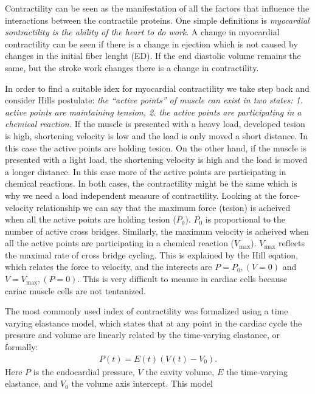Contractility can be seen as the manifestation of all the factors that
influence the interactions between the contractile proteins.
One simple definitions is \emph{myocardial sontractility is the
  ability of the heart to do work}. A change in myocardial
contractility can be seen if there is a change in ejection which is
not caused by changes in the initial fiber lenght (ED). If the end
diastolic volume remains the same, but the stroke work changes there
is a change in contractility.



In order to find a suitable idex for myocardial contractility we take
step back and consider Hills postulate: \emph{the ``active points'' of
  muscle can exist in two states: 1. active points are maintaining
  tension, 2. the active points are participating in a chemical
  reaction.} 
If the muscle is presented with a heavy load, developed tesion is
high, shortening velocity is low and the load is only moved a short
distance. In this case the active points are holding tesion.
On the other hand, if the muscle is presented with a light load, the
shortening velocity is high and the load is moved a longer
distance. In this case more of the active points are participating in
chemical reactions. 
In both cases, the contractility might be the same which is why we
need a load independent measure of contractility.
Looking at the force-velocity relationship we can say that the maximum
force (tesion) is acheived when all the active points are holding
tesion ($P_0$). $P_0$ is proportional to the number of active
cross bridges.
Similarly, the maximum velocity is acheived when all
the active points are participating in a chemical reaction
($V_{\text{max}}$). $V_{\text{max}}$ reflects the maximal rate of
cross bridge cycling. 
This is explained by the Hill eqation, which
relates the force to velocity, and the interects are $P = P_0, (V = 0)$
and $V = V_{\text{max}}, (P = 0)$. This is very difficult to meause in
cardiac cells because cariac muscle cells are not tentanized.

The most commonly used index of contractility was formalized
\cite{sagawa1977end} using a time varying elastance model, which
states that at any point in the cardiac cycle the pressure and volume
are linearly related by the time-varying elastance, or formally:
\begin{align}
  P(t) = E(t)( V(t) - V_0 ).
  \label{eq:time_varying_elastance}
\end{align}
Here $P$ is the endocardial pressure, $V$ the cavity volume, $E$ the
time-varying elastance, and $V_0$ the volume axis intercept. This
model


